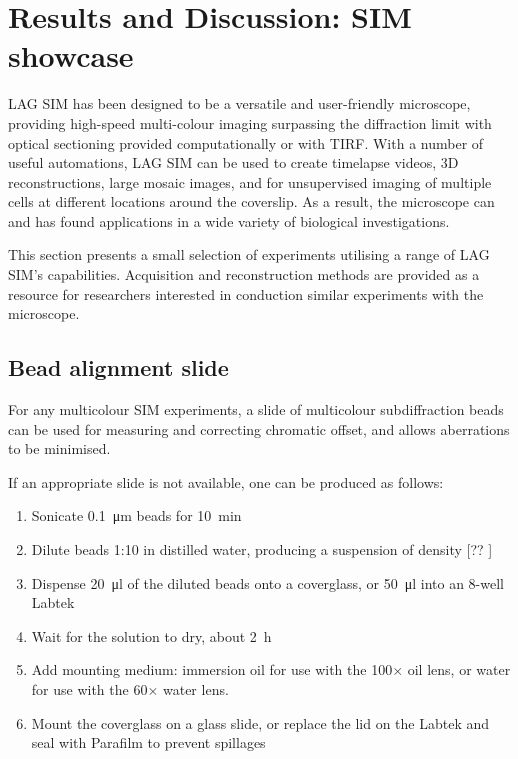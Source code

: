 \section{Results and Discussion: SIM showcase} \label{sec:sim-showcase}
LAG SIM has been designed to be a versatile and user-friendly microscope, providing high-speed multi-colour imaging surpassing the diffraction limit with optical sectioning provided computationally or with TIRF. 
With a number of useful automations, LAG SIM can be used to create timelapse videos, 3D reconstructions, large mosaic images, and for unsupervised imaging of multiple cells at different locations around the coverslip. 
As a result, the microscope can and has found applications in a wide variety of biological investigations.

This section presents a small selection of experiments utilising a range of LAG SIM's capabilities. 
Acquisition and reconstruction methods are provided as a resource for researchers interested in conduction similar experiments with the microscope. 

\subsection{Bead alignment slide}
For any multicolour SIM experiments, a slide of multicolour subdiffraction beads can be used for measuring and correcting chromatic offset, and allows aberrations to be minimised. 

If an appropriate slide is not available, one can be produced as follows: 
\begin{enumerate}
	\item Sonicate \SI{0.1}{\micro\metre} beads for \SI{10}{\minute}
	\item Dilute beads 1:10 in distilled water, producing a suspension of density [?? ]
	\item Dispense \SI{20}{\micro\litre} of the diluted beads onto a coverglass, or \SI{50}{\micro\litre} into an 8-well Labtek
	\item Wait for the solution to dry, about \SI{2}{\hour}
	\item Add mounting medium: immersion oil for use with the 100$\times$ oil lens, or water for use with the 60$\times$ water lens. 
	\item Mount the coverglass on a glass slide, or replace the lid on the Labtek and seal with Parafilm to prevent spillages
\end{enumerate}


